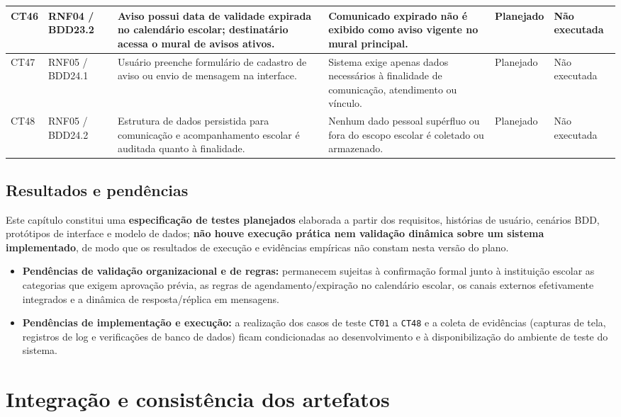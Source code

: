 \documentclass[a4paper,12pt]{report}
\begin{document}
\begin{longtable}{|p{1.2cm}|p{2.0cm}|p{3.8cm}|p{4.0cm}|p{1.6cm}|p{2.0cm}|}
\hline
CT46 & RNF04 / BDD23.2 & Aviso possui data de validade expirada no calendário escolar; destinatário acessa o mural de avisos ativos. & Comunicado expirado não é exibido como aviso vigente no mural principal. & Planejado & Não executada \\
\hline
CT47 & RNF05 / BDD24.1 & Usuário preenche formulário de cadastro de aviso ou envio de mensagem na interface. & Sistema exige apenas dados necessários à finalidade de comunicação, atendimento ou vínculo. & Planejado & Não executada \\
\hline
CT48 & RNF05 / BDD24.2 & Estrutura de dados persistida para comunicação e acompanhamento escolar é auditada quanto à finalidade. & Nenhum dado pessoal supérfluo ou fora do escopo escolar é coletado ou armazenado. & Planejado & Não executada \\
\hline
\end{longtable}

\section{Resultados e pendências}

Este capítulo constitui uma \textbf{especificação de testes planejados} elaborada a partir dos requisitos, histórias de usuário, cenários BDD, protótipos de interface e modelo de dados; \textbf{não houve execução prática nem validação dinâmica sobre um sistema implementado}, de modo que os resultados de execução e evidências empíricas não constam nesta versão do plano.

\begin{itemize}
    \item \textbf{Pendências de validação organizacional e de regras:} permanecem sujeitas à confirmação formal junto à instituição escolar as categorias que exigem aprovação prévia, as regras de agendamento/expiração no calendário escolar, os canais externos efetivamente integrados e a dinâmica de resposta/réplica em mensagens.
    \item \textbf{Pendências de implementação e execução:} a realização dos casos de teste \texttt{CT01} a \texttt{CT48} e a coleta de evidências (capturas de tela, registros de log e verificações de banco de dados) ficam condicionadas ao desenvolvimento e à disponibilização do ambiente de teste do sistema.
\end{itemize}

\chapter{Integração e consistência dos artefatos}
\end{document}

